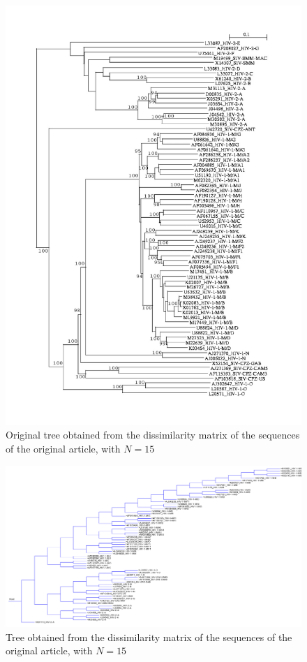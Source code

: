 \documentclass[english,13pt,a4paper]{article}
\theoremstyle{definition}
\theoremstyle{remark}
\theoremstyle{defstyle}
\begin{document}
\begin{figure}[H]
    \centering
    \includegraphics[width=\textwidth]{../Trees/original_66_tree.png}
    \caption{Original tree obtained from the dissimilarity matrix of the sequences of the original article, with $N = 15$}
    \label{fig:original_tree66}
\end{figure}

\begin{figure}[H]
    \centering
    \includegraphics[width=.95\textheight, angle=90]{../Trees/66_tree.png}
    \caption{Tree obtained from the dissimilarity matrix of the sequences of the original article, with $N = 15$}
    \label{fig:tree66}
\end{figure}




\newpage
{}
\printbibliography
\end{document}
